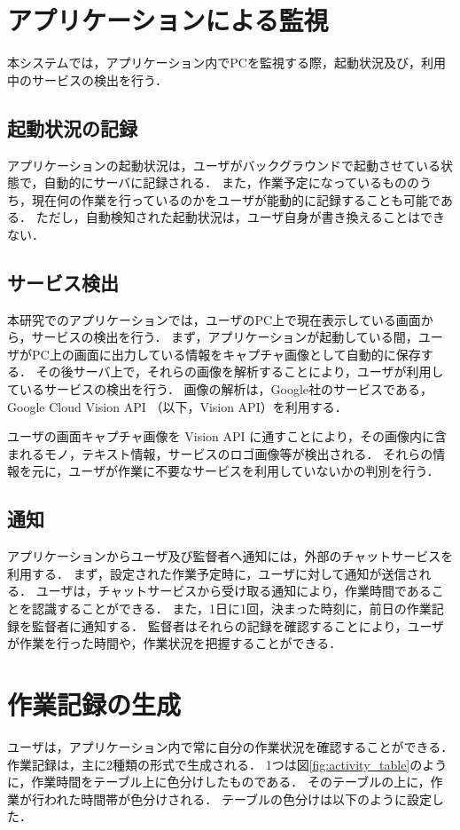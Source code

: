 \section{アプリケーションによる監視}
本システムでは，アプリケーション内でPCを監視する際，起動状況及び，利用中のサービスの検出を行う．

\subsection{起動状況の記録}
アプリケーションの起動状況は，ユーザがバックグラウンドで起動させている状態で，自動的にサーバに記録される．
また，作業予定になっているもののうち，現在何の作業を行っているのかをユーザが能動的に記録することも可能である．
ただし，自動検知された起動状況は，ユーザ自身が書き換えることはできない．

\subsection{サービス検出}
本研究でのアプリケーションでは，ユーザのPC上で現在表示している画面から，サービスの検出を行う．
まず，アプリケーションが起動している間，ユーザがPC上の画面に出力している情報をキャプチャ画像として自動的に保存する．
その後サーバ上で，それらの画像を解析することにより，ユーザが利用しているサービスの検出を行う．
画像の解析は，Google社のサービスである， Google Cloud Vision API （以下，Vision API）を利用する．

ユーザの画面キャプチャ画像を Vision API に通すことにより，その画像内に含まれるモノ，テキスト情報，サービスのロゴ画像等が検出される．
それらの情報を元に，ユーザが作業に不要なサービスを利用していないかの判別を行う．


\subsection{通知}
アプリケーションからユーザ及び監督者へ通知には，外部のチャットサービスを利用する．
まず，設定された作業予定時に，ユーザに対して通知が送信される．
ユーザは，チャットサービスから受け取る通知により，作業時間であることを認識することができる．
また，1日に1回，決まった時刻に，前日の作業記録を監督者に通知する．
監督者はそれらの記録を確認することにより，ユーザが作業を行った時間や，作業状況を把握することができる．

\clearpage

\section{作業記録の生成}
ユーザは，アプリケーション内で常に自分の作業状況を確認することができる．
作業記録は，主に2種類の形式で生成される．
1つは図\ref{fig:activity_table}のように，作業時間をテーブル上に色分けしたものである．
そのテーブルの上に，作業が行われた時間帯が色分けされる．
テーブルの色分けは以下のように設定した．

